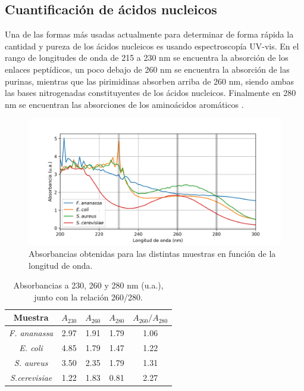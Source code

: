 \documentclass[fleqn,10pt]{SelfArx}
\begin{document}
	\subsection{Cuantificaci\'on de \'acidos nucleicos}
		Una de las formas más usadas actualmente para determinar de forma rápida la cantidad y pureza de los ácidos nucleicos es usando espectroscopía UV-vis. En el rango de longitudes de onda de 215 a 230 nm se encuentra la absorción de los enlaces peptídicos, un poco debajo de 260 nm se encuentra la absorción de las purinas, mientras que las pirimidinas absorben arriba de 260 nm, siendo ambas las bases nitrogenadas constituyentes de los ácidos nucleicos. Finalmente en 280 nm se encuentran las absorciones de los aminoácidos aromáticos \cite{sambrook2001molecular}.
		
	\begin{figure}[h]
		\centering
		\includegraphics[width=\linewidth]{plots}
		\caption{Absorbancias obtenidas para las distintas muestras en funci\'on de la longitud de onda.}
	\end{figure}	

	\begin{table}[h]
		\centering
		\caption{Absorbancias a 230, 260 y 280 nm (u.a.), junto con la relaci\'on 260/280.}
		\begin{tabular}{c|ccc|c}
			\hline
			\textbf{Muestra} & $A_{230}$ & $A_{260}$ & $A_{280}$ & $A_{260} / A_{280}$ \\
			\hline
			\textit{F. ananassa} & 2.97 & 1.91 & 1.79 & 1.06 \\
			\textit{E. coli} & 4.85 & 1.79 & 1.47 & 1.22 \\
			\textit{S. aureus} & 3.50 & 2.35 & 1.79 & 1.31 \\
			\textit{S.cerevisiae} & 1.22 & 1.83 & 0.81 & 2.27 \\
			\hline
		\end{tabular}
	\end{table}
\end{document}
